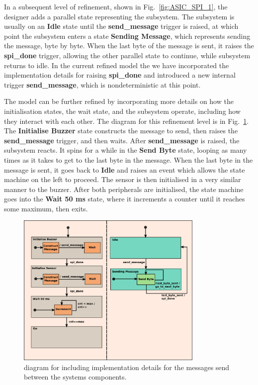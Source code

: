 In a subsequent level of refinement, shown in Fig.~\ref{fig:ASIC_SPI_1}, the designer adds a parallel state representing the \SPI subsystem. The \SPI subsystem is usually on an \textbf{Idle} state until the \textbf{send\_message} trigger is raised, at which point the \SPI subsystem enters a state \textbf{Sending Message}, which represents sending the message, byte by byte. When the last byte of the message is sent, it raises the \textbf{spi\_done} trigger, allowing the other parallel state to continue, while \SPI subsystem returns to idle. In the current refined model the we have incorporated the implementation details for raising \textbf{spi\_done} and introduced a new internal trigger 
\textbf{send\_message}, which is nondeterministic at this point.

The model can be further refined by incorporating more details on how the initialisation states, the wait state, and the \SPI subsystem operate, including how they interact with each other. The \statechart diagram for this refinement level is in Fig.~\ref{fig:ASIC_SPI_2}. The \textbf{Initialise Buzzer} state constructs the \SPI message to send, then raises the \textbf{send\_message} trigger, and then waits.
After \textbf{send\_message} is raised, the \SPI subsystem reacts. It spins for a while in the \textbf{Send Byte} state, looping as many times as it takes to get to the last byte in the message. When the last byte in the message is sent, it goes back to \textbf{Idle} and raises an event which allows the state machine on the left to proceed. The sensor is then initialised in a very similar manner to the buzzer. After both peripherals are initialised, the state machine goes into the \textbf{Wait 50 ms} state, where it increments a counter until it reaches some maximum, then exits.

\begin{figure}[!htbp]
  \begin{centering}
  \includegraphics[width=0.8\textwidth]{figures/ASIC&SPI_2}
  \caption{\Statechart diagram for \IDS including implementation details for the messages send between the systems components.}
  \label{fig:ASIC_SPI_2}
  \end{centering}
\end{figure} 

